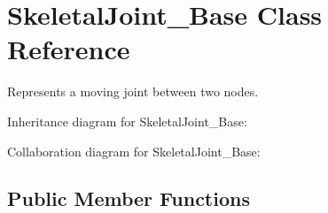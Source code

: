 \hypertarget{class_skeletal_joint___base}{}\section{Skeletal\+Joint\+\_\+\+Base Class Reference}
\label{class_skeletal_joint___base}


Represents a moving joint between two nodes.  




Inheritance diagram for Skeletal\+Joint\+\_\+\+Base\+:


Collaboration diagram for Skeletal\+Joint\+\_\+\+Base\+:
\subsection*{Public Member Functions}
